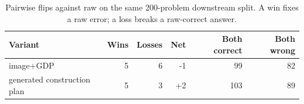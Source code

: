 \begin{table}[t]
\centering
\caption{Pairwise flips against raw on the same 200-problem downstream split. A win fixes a raw error; a loss breaks a raw-correct answer.}
\label{tab:downstream200-pairwise}
\small
\begin{tabular}{lrrrrr}
\toprule
Variant & Wins & Losses & Net & Both correct & Both wrong \\
\midrule
image+GDP & 5 & 6 & -1 & 99 & 82 \\
generated construction plan & 5 & 3 & +2 & 103 & 89 \\
\bottomrule
\end{tabular}
\end{table}
